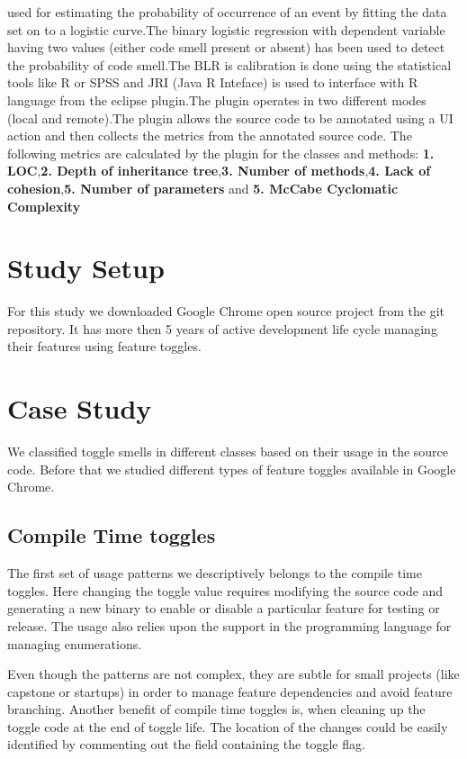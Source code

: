 \documentclass[conference]{IEEEtran}
\begin{document}
used for estimating the probability of occurrence of an event by fitting the data set on to a logistic curve.The binary logistic regression with dependent variable having two values (either code smell present or absent) has been used to detect the probability of code smell.The BLR is calibration is done using the statistical tools like R or SPSS and JRI (Java R Inteface) is used to interface with R language from the eclipse plugin.The plugin operates in two different modes (local and remote).The plugin allows the source code to be annotated using a UI action and then collects the metrics from the annotated source code. The following metrics are calculated by the plugin for the classes and methods: \textbf{1. LOC},\textbf{2. Depth of inheritance tree},\textbf{3. Number of methods},\textbf{4. Lack of cohesion},\textbf{5. Number of parameters} and \textbf{5. McCabe Cyclomatic Complexity}


\section{Study Setup}
\label{study-setup}
For this study we downloaded Google Chrome open source project from the git repository. It has more then 5 years of active development life cycle 
managing their features using feature toggles. 

\section{Case Study}
We classified toggle smells in different classes based on their usage in 
the source code. Before that we studied different types of feature toggles 
available in Google Chrome.

\subsection{Compile Time toggles}
The first set of usage patterns we descriptively belongs to the compile 
time toggles. Here changing the toggle value requires modifying the source 
code and generating a new binary to enable or disable a particular feature 
for testing or release. The usage also relies upon the support in the 
programming language for managing enumerations. 

Even though the patterns are not complex, they are subtle for small projects (like capstone or startups) in order to manage feature dependencies and 
avoid feature branching. Another benefit of compile time toggles is, when 
cleaning up the toggle code at the end of toggle life. The location of the 
changes could be easily identified by commenting out the field containing the toggle flag.
\end{document}
